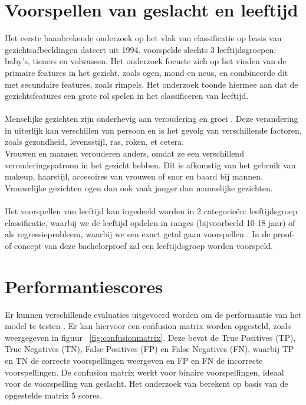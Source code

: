 \section{Voorspellen van geslacht en leeftijd} \label{sec:voorspellen}
Het eerste baanbrekende onderzoek op het vlak van classificatie op basis van gezichtsafbeeldingen dateert uit 1994. \textcite{Kwon1994} voorspelde slechts 3 leeftijdsgroepen: baby's, tieners en volwassen. Het onderzoek focuste zich op het vinden van de primaire features in het gezicht, zoals ogen, mond en neus, en combineerde dit met secundaire features, zoals rimpels. Het onderzoek toonde hiermee aan dat de gezichtsfeatures een grote rol spelen in het classificeren van leeftijd. \\
\\ 
Menselijke gezichten zijn onderhevig aan veroudering en groei \autocite{Gupta2022}. Deze verandering in uiterlijk kan verschillen van persoon en is het gevolg van verschillende factoren, zoals gezondheid, levensstijl, ras, roken, et cetera. \\
Vrouwen en mannen verouderen anders, omdat ze een verschillend verouderingspatroon in het gezicht hebben. Dit is afkomstig van het gebruik van makeup, haarstijl, accesoires van vrouwen of snor en baard bij mannen. Vrouwelijke gezichten ogen dan ook vaak jonger dan mannelijke gezichten. \\
\\
Het voorspellen van leeftijd kan ingedeeld worden in 2 categorieën: leeftijdsgroep classificatie, waarbij we de leeftijd opdelen in ranges (bijvoorbeeld 10-18 jaar) of als regressieprobleem, waarbij we een exact getal gaan voorspellen \autocite{Gupta2022}. In de proof-of-concept van deze bachelorproef zal een leeftijdsgroep worden voorspeld. \\

\section{Performantiescores} \label{sec:performantiescores}
Er kunnen verschillende evaluaties uitgevoerd worden om de performantie van het model te testen \autocite{Sanil2023}. Er kan hiervoor een confusion matrix worden opgesteld, zoals weergegeven in figuur {~\ref{fig:confusionmatrix}}. Deze bevat de True Positives (TP), True Negatives (TN), False Positives (FP) en False Negatives (FN), waarbij TP en TN de correcte voorspellingen weergeven en FP en FN de incorrecte voorspellingen. De confusion matrix werkt voor binaire voorspellingen, ideaal voor de voorspelling van geslacht. Het onderzoek van \textcite{Sanil2023} berekent op basis van de opgestelde matrix 5 scores.
 
